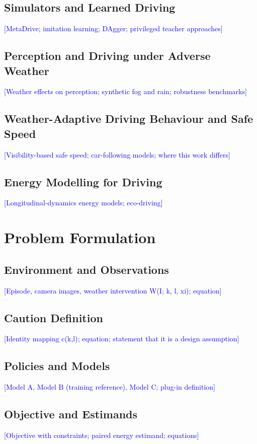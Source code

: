 \documentclass[conference]{IEEEtran}
\newcommand{\placeholder}[1]{\textcolor{blue}{[#1]}}
\begin{document}
\subsection{Simulators and Learned Driving}
\placeholder{MetaDrive; imitation learning; DAgger; privileged teacher approaches}
\subsection{Perception and Driving under Adverse Weather}
\placeholder{Weather effects on perception; synthetic fog and rain; robustness benchmarks}
\subsection{Weather-Adaptive Driving Behaviour and Safe Speed}
\placeholder{Visibility-based safe speed; car-following models; where this work differs}
\subsection{Energy Modelling for Driving}
\placeholder{Longitudinal-dynamics energy models; eco-driving}

\section{Problem Formulation}\label{sec:problem}
\subsection{Environment and Observations}
\placeholder{Episode, camera images, weather intervention W(I; k, l, xi); equation}
\subsection{Caution Definition}
\placeholder{Identity mapping c(k,l); equation; statement that it is a design assumption}
\subsection{Policies and Models}
\placeholder{Model A, Model B (training reference), Model C; plug-in definition}
\subsection{Objective and Estimands}
\placeholder{Objective with constraints; paired energy estimand; equations}
\end{document}
